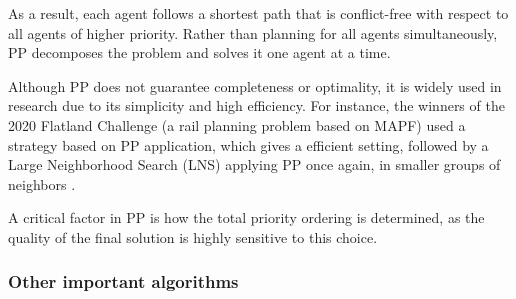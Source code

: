 As a result, each agent follows a shortest path that is conflict-free with respect to all agents of higher priority. Rather than planning for all agents simultaneously, PP decomposes the problem and solves it one agent at a time.

Although PP does not guarantee completeness or optimality, it is widely used in research due to its simplicity and high efficiency. For instance, the winners of the 2020 Flatland Challenge (a rail planning problem based on MAPF) used a strategy based on PP application, which gives a efficient setting, followed by a Large Neighborhood Search (LNS) applying PP once again, in smaller groups of neighbors \cite{liScalableRailPlanning2021a}.

A critical factor in PP is how the total priority ordering is determined, as the quality of the final solution is highly sensitive to this choice.

\subsubsection{Other important algorithms}

